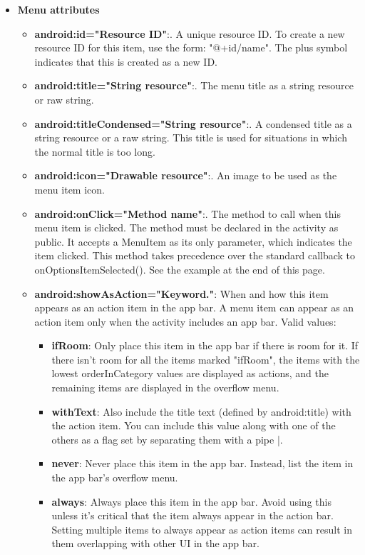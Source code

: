 \documentclass{report}
\begin{document}
\begin{itemize}
        \item \textbf{Menu attributes}
            \begin{itemize}
                \item \textbf{android:id="Resource ID"}:. A unique resource ID. To create a new resource ID for this item, use the form: "@+id/name". The plus symbol indicates that this is created as a new ID.
                \item \textbf{android:title="String resource"}:. The menu title as a string resource or raw string.
                \item \textbf{android:titleCondensed="String resource"}:. A condensed title as a string resource or a raw string. This title is used for situations in which the normal title is too long.
                \item \textbf{android:icon="Drawable resource"}:. An image to be used as the menu item icon.
                \item \textbf{android:onClick="Method name"}:. The method to call when this menu item is clicked. The method must be declared in the activity as public. It accepts a MenuItem as its only parameter, which indicates the item clicked. This method takes precedence over the standard callback to onOptionsItemSelected(). See the example at the end of this page.
                \item \textbf{android:showAsAction="Keyword."}: When and how this item appears as an action item in the app bar. A menu item can appear as an action item only when the activity includes an app bar. Valid values:
                    \begin{itemize}
                        \item \textbf{ifRoom}:	Only place this item in the app bar if there is room for it. If there isn't room for all the items marked "ifRoom", the items with the lowest orderInCategory values are displayed as actions, and the remaining items are displayed in the overflow menu.
                        \item \textbf{withText}:	Also include the title text (defined by android:title) with the action item. You can include this value along with one of the others as a flag set by separating them with a pipe |.
                        \item \textbf{never}:	Never place this item in the app bar. Instead, list the item in the app bar's overflow menu.
                        \item \textbf{always}:	Always place this item in the app bar. Avoid using this unless it's critical that the item always appear in the action bar. Setting multiple items to always appear as action items can result in them overlapping with other UI in the app bar.

\end{itemize}
\end{itemize}
\end{itemize}
\end{document}
